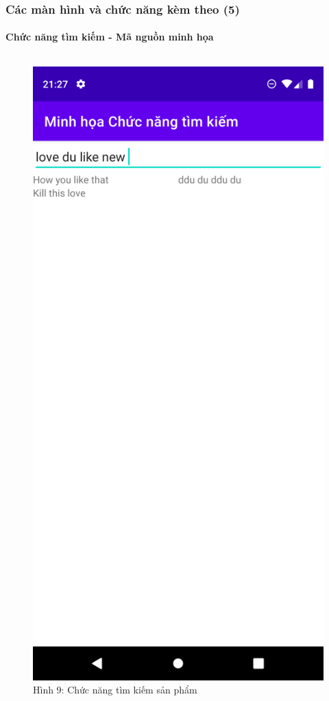 \documentclass{beamer}
\begin{document}
\begin{frame}
    \frametitle{Các màn hình và chức năng kèm theo (5)}
    \framesubtitle{Chức năng tìm kiếm - Mã nguồn minh họa}

    \begin{columns}
        \begin{figure}
            \centering
            \includegraphics[height=0.7\textheight]{images/40.png}
            \caption{\centering\tiny{Hình 9: Chức năng tìm kiếm sản phẩm}}

        \end{figure}
        \indent 
    \end{columns}
\end{frame}
\end{document}
